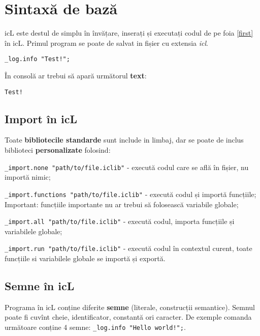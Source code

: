 \section{Sintaxă de bază}

icL este destul de simplu în învățare, inserați și executați codul de pe foia \ref{first} în icL. Primul program se poate de salvat in fișier cu extensia \textit{icl}.

\begin{lstlisting}[caption=Prima programă, label=first]
_log.info "Test!";
\end{lstlisting}

În consolă ar trebui să apară următorul \textbf{text}:

\begin{lstlisting}[numbers=none]
Test!
\end{lstlisting}

\subsection{Import în icL}

Toate \textbf{bibliotecile standarde} sunt include in limbaj, dar se poate de inclus biblioteci \textbf{personalizate} folosind:

\begin{icItems}
\item
	\lstinline|_import.none "path/to/file.iclib"| - execută codul care se află în fișier, nu importă nimic;
\item
	\lstinline|_import.functions "path/to/file.iclib"| - execută codul și importă funcțiile; {\color{red}Important:} funcțiile importante nu ar trebui să folosească variabile globale;
\item
	\lstinline|_import.all "path/to/file.iclib"| -  execută codul, importa funcțiile și variabilele globale;
\item
	\lstinline|_import.run "path/to/file.iclib"| - execută codul în contextul curent, toate funcțiile si variabilele globale se importă și exportă.
\end{icItems}

\subsection{Semne în icL}

Programa în icL conține diferite \textbf{semne} (literale, construcții semantice). Semnul poate fi cuvînt cheie, identificator, constantă ori caracter. De exemple comanda următoare conține 4 semne: \lstinline|_log.info "Hello world!";|.

